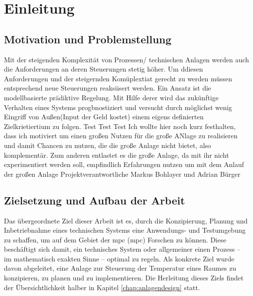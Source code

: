 %
%

\renewcommand{\chapterheadstartvskip}{\vspace*{3cm}}
\chapter{Einleitung}
\label{chap:einleitung}
\setcounter{page}{1}
\renewcommand{\chapterheadstartvskip}{\vspace*{-1cm}}


\section{Motivation und Problemstellung}
\label{sec:motivation}
Mit der steigenden Komplexität von Prozessen/ technischen Anlagen werden auch die Anforderungen an deren Steuerungen stetig höher. Um ddiesen Anforderungen und der steigernden Komüplextiat gerecht zu werden müssen entsprechend neue Steuerungen reaksiisert werden. Ein Ansatz ist die modellbasierte prädiktive Regelung. Mit Hilfe derer wird das zukünftige Verhalten eines Systems progbnostiziert und versucht durch möglichst wenig Eingriff von Außen(Input der Geld kostet) einem eigens definierten Zielkrietiertium zu folgen.
Test Test Test
Ich wollte hier noch kurz festhalten, dass ich motiviert um einen großen Nutzen für die große ANlage zu realisieren und damit Chancen zu nutzen, die die große Anlage nicht bietet, also komplementär.
Zum anderen entlastet es die große Anlage, da mit ihr nicht experimentiert werden soll, empfindlich
Erfahrungen nutzen um mit dem Anlauf der großen Anlage 
Projektverantwortliche Markus Bohlayer und Adrian Bürger

\section{Zielsetzung und Aufbau der Arbeit}
\label{sec:ziel}
Das übergeordnete Ziel dieser Arbeit ist es, durch die Konzipierung, Planung und Inbetriebnahme eines technischen Systems eine Anwendungs- und Testumgebung zu schaffen, um auf dem Gebiet der \acrlong{mpc} (\acrshort{mpc}) Forschen zu können.
Diese beschäftigt sich damit, ein technisches System oder allgemeiner einen Prozess -- im mathematisch exakten Sinne -- optimal zu regeln.
Als konkrete Ziel wurde davon abgeleitet, eine Anlage zur Steuerung der Temperatur eines Raumes zu konzipieren, zu planen und zu implementieren. 
Die Herleitung dieses Ziels findet der Übersichtlichkeit halber in Kapitel \ref{chap:anlagendesign} statt.

